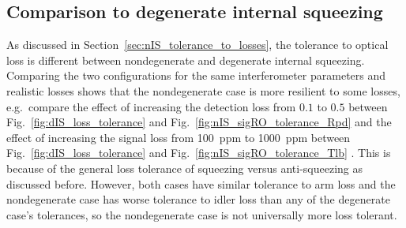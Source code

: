 \subsection{Comparison to degenerate internal squeezing}

As discussed in Section~\ref{sec:nIS_tolerance_to_losses}, the tolerance to optical loss is different between nondegenerate and degenerate internal squeezing. Comparing the two configurations for the same interferometer parameters and realistic losses shows that the nondegenerate case is more resilient to some losses, e.g.\ compare the effect of increasing the detection loss from $0.1$ to $0.5$ between Fig.~\ref{fig:dIS_loss_tolerance} and Fig.~\ref{fig:nIS_sigRO_tolerance_Rpd} and the effect of increasing the signal loss from 100~ppm to 1000~ppm between Fig.~\ref{fig:dIS_loss_tolerance} and Fig.~\ref{fig:nIS_sigRO_tolerance_Tlb} . 
This is because of the general loss tolerance of squeezing versus anti-squeezing as discussed before. %
However, both cases have similar tolerance to arm loss and the nondegenerate case has worse tolerance to idler loss than any of the degenerate case's tolerances, so the nondegenerate case is not universally more loss tolerant.  
